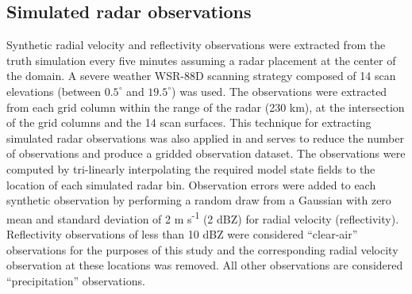 \subsection{Simulated radar observations}
Synthetic radial velocity and reflectivity observations were extracted from the truth simulation every five minutes assuming a radar placement at the center of the domain. A severe weather WSR-88D scanning strategy composed of 14 scan elevations (between \(0.5^{\circ}\) and \(19.5^{\circ}\)) was used. The observations were extracted from each grid column within the range of the radar (230 km), at the intersection of the grid columns and the 14 scan surfaces. This technique for extracting simulated radar observations was also applied in \citet{tongxue05} and serves to reduce the number of observations and produce a gridded observation dataset. The observations were computed by tri-linearly interpolating the required model state fields to the location of each simulated radar bin. Observation errors were added to each synthetic observation by performing a random draw from a Gaussian with zero mean and standard deviation of 2 m s\textsuperscript{-1} (2 dBZ) for radial velocity (reflectivity). Reflectivity observations of less than 10 dBZ were considered “clear-air” observations for the purposes of this study and the corresponding radial velocity observation at these locations was removed. All other observations are considered “precipitation” observations.

